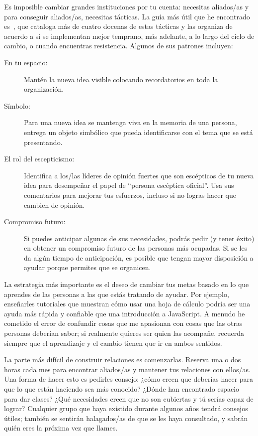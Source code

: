 Es imposible cambiar grandes instituciones por tu cuenta:
necesitas aliados/as
y para conseguir aliados/as,
necesitas tácticas.
La guía más útil que he encontrado es~\cite{Mann2015}, 
que cataloga más de cuatro docenas de estas tácticas
y las organiza de acuerdo a si se implementan mejor temprano,
más adelante,
a lo largo del ciclo de cambio,
o cuando encuentras resistencia.
Algunos de sus patrones incluyen:

\begin{description}

\item[En tu espacio:]
Mantén la nueva idea visible
colocando recordatorios en toda la organización.

\item[Símbolo:] 
Para una nueva idea se mantenga viva en la memoria de una persona,
entrega un objeto simbólico  que pueda identificarse con el tema que se está presentando.

\item[El rol del escepticismo:]
Identifica a los/las líderes de opinión fuertes que son escépticos de tu nueva 
idea para desempeñar el papel de ``persona escéptica oficial''.
Usa sus comentarios para mejorar tus esfuerzos,
incluso si no logras hacer que cambien de opinión.

\item[Compromiso futuro:]
Si puedes anticipar algunas de sus necesidades,
podrás pedir (y tener éxito) en obtener un compromiso 
futuro de las personas más ocupadas.
Si se les da algún tiempo de anticipación, 
es posible que tengan mayor disposición a ayudar
porque permites que se organicen.

\end{description}

La estrategia más importante es
el deseo de cambiar tus metas
basado en lo que aprendes de las personas a las que estás tratando de ayudar.
Por ejemplo, enseñarles tutoriales que muestran cómo usar una hoja de cálculo
podría ser una ayuda más rápida y confiable que 
una introducción a JavaScript.
A menudo he cometido el error de confundir cosas que me apasionan
con cosas que las otras personas deberían saber;
si realmente quieres ser quien las acompañe,
recuerda siempre que el aprendizaje y el cambio tienen que ir en ambos sentidos.

La parte más difícil de construir relaciones es comenzarlas.
Reserva una o dos horas cada mes
para encontrar aliados/as y mantener tus relaciones con ellos/as.
Una forma de hacer esto es pedirles consejo:
¿cómo creen que deberías hacer para que lo que están haciendo sea más conocido?
¿Dónde han encontrado espacio para dar clases?
¿Qué necesidades creen que no son cubiertas
y tú serías capaz de lograr?
Cualquier grupo que haya existido durante algunos años tendrá consejos útiles;
también se sentirán halagados/as de que se les haya consultado,
y sabrán quién eres la próxima vez que llames.



